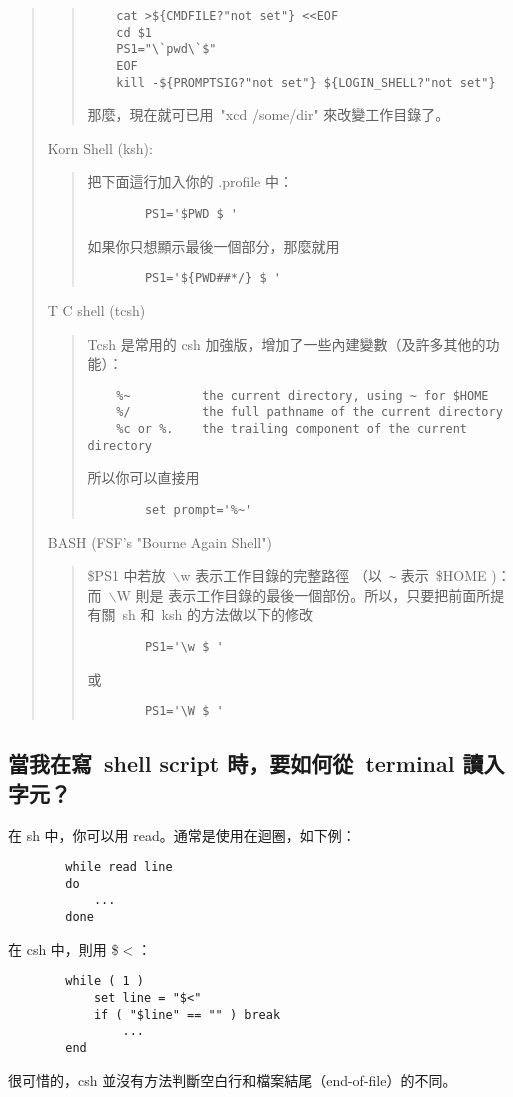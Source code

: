 \documentclass{article}
\begin{document}
\begin{CJK*}{Bg5}{ming}
\begin{quote}
\begin{quote}
\begin{verbatim}
	cat >${CMDFILE?"not set"} <<EOF
	cd $1
	PS1="\`pwd\`$"
	EOF
	kill -${PROMPTSIG?"not set"} ${LOGIN_SHELL?"not set"}
\end{verbatim}
\normalsize
	那麼，現在就可已用~"xcd /some/dir" 來改變工作目錄了。
	\end{quote}

	Korn Shell (ksh):
	\begin{quote}
	  把下面這行加入你的 .profile 中：
\begin{verbatim}
		PS1='$PWD $ '
\end{verbatim}
	  如果你只想顯示最後一個部分，那麼就用
\begin{verbatim}
		PS1='${PWD##*/} $ '
\end{verbatim}
	\end{quote}

	T C shell (tcsh)
	\begin{quote}
	  Tcsh 是常用的 csh 加強版，增加了一些內建變數（及許多其他的功
	  能）：
\small
\begin{verbatim}
	%~          the current directory, using ~ for $HOME
	%/          the full pathname of the current directory
	%c or %.    the trailing component of the current directory
\end{verbatim}
\normalsize
	  所以你可以直接用
\begin{verbatim}
		set prompt='%~'
\end{verbatim}
	\end{quote}

	BASH (FSF's "Bourne Again Shell")
	\begin{quote}
	  \$PS1 中若放~$\backslash$w 表示工作目錄的完整路徑
	（以~\verb+~+ 表示~\$HOME )： 而~$\backslash$W 則是
	表示工作目錄的最後一個部份。所以，只要把前面所提
	  有關~sh 和~ksh 的方法做以下的修改
\begin{verbatim}
		PS1='\w $ ' 
\end{verbatim}
	  或
\begin{verbatim}
		PS1='\W $ '
\end{verbatim}
	\end{quote}
\end{quote}

\subsection{當我在寫~shell script 時，要如何從~terminal 讀入字元？}

	在 sh 中，你可以用 read。通常是使用在迴圈，如下例：
\begin{verbatim}
		while read line
		do
		    ...
		done
\end{verbatim}
	在 csh 中，則用 \$$<$：
\begin{verbatim}
		while ( 1 )
		    set line = "$<"
		    if ( "$line" == "" ) break
		        ...
		end
\end{verbatim}
	很可惜的，csh 並沒有方法判斷空白行和檔案結尾（end-of-file）的不同。


\end{CJK*}
\end{document}
